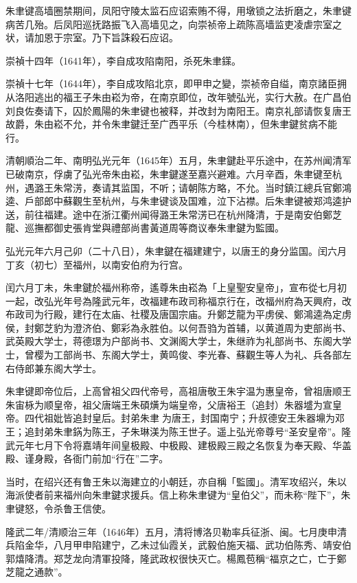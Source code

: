 朱聿键高墙圈禁期间，凤阳守陵太监石应诏索贿不得，用墩锁之法折磨之，朱聿键病苦几殆。后凤阳巡抚路振飞入高墙见之，向崇祯帝上疏陈高墙监吏凌虐宗室之状，请加恩于宗室。乃下旨誅殺石应诏。

崇禎十四年（1641年），李自成攻陷南阳，杀死朱聿鏼。

崇禎十七年（1644年），李自成攻陷北京，即甲申之變，崇祯帝自缢，南京諸臣拥从洛阳逃出的福王子朱由崧为帝，在南京即位，改年號弘光，实行大赦。在广昌伯刘良佐奏请下，囚於鳳陽的朱聿键也被释，并改封为南阳王。南京礼部请恢复唐王故爵，朱由崧不允，并令朱聿鍵迁至广西平乐（今桂林南），但朱聿鍵贫病不能行。

清朝順治二年、南明弘光元年（1645年）五月，朱聿鍵赴平乐途中，在苏州闻清军已破南京，俘虜了弘光帝朱由崧，朱聿鍵遂至嘉兴避难。六月辛酉，朱聿键至杭州，遇潞王朱常淓，奏请其监国，不听；请朝陈方略，不允。当时鎮江總兵官鄭鴻逵、戶部郎中蘇觀生至杭州，与朱聿键谈及国难，泣下沾襟。后朱聿键被郑鸿逵护送，前往福建。途中在浙江衢州闻得潞王朱常淓已在杭州降清，于是南安伯鄭芝龍、巡撫都御史張肯堂與禮部尚書黃道周等商议奉朱聿鍵为監國。

弘光元年六月己卯（二十八日），朱聿鍵在福建建宁，以唐王的身分监国。闰六月丁亥（初七）至福州，以南安伯府为行宫。

闰六月丁未，朱聿鍵於福州称帝，遙尊朱由崧為「上皇聖安皇帝」，宣布從七月初一起，改弘光年号為隆武元年，改福建布政司称福京行在，改福州府為天興府，改布政司为行殿，建行在太庙、社稷及唐国宗庙。升鄭芝龍为平虏侯、鄭鴻逵為定虏侯，封鄭芝豹为澄济伯、鄭彩為永胜伯。以何吾驺为首辅，以黄道周为吏部尚书、武英殿大学士，蒋德璟为户部尚书、文渊阁大学士，朱继祚为礼部尚书、东阁大学士，曾樱为工部尚书、东阁大学士，黄鸣俊、李光春、蘇觀生等人为礼、兵各部左右侍郎兼东阁大学士。

朱聿键即帝位后，上高曾祖父四代帝号，高祖唐敬王朱宇温为惠皇帝，曾祖唐顺王朱宙栐为顺皇帝，祖父唐端王朱碩熿为端皇帝，父唐裕王（追封）朱器墭为宣皇帝。四代祖妣皆追封皇后。封弟朱聿𨮁为唐王，封国南宁；升叔德安王朱器䵺为邓王；追封弟朱聿𨧨为陈王，子朱琳渼为陈王世子。遥上弘光帝尊号“圣安皇帝”。隆武元年七月下令将嘉靖年间皇极殿、中极殿、建极殿三殿之名恢复为奉天殿、华盖殿、谨身殿，各衙门前加“行在”二字。

当时，在绍兴还有鲁王朱以海建立的小朝廷，亦自稱「監國」。清军攻绍兴，朱以海派使者前来福州向朱聿鍵求援兵。信上称朱聿键为“皇伯父”，而未称“陛下”，朱聿键怒，令杀鲁王信使。

隆武二年/清顺治三年（1646年）五月，清将博洛贝勒率兵征浙、闽。七月庚申清兵陷金华，八月甲申陷建宁，乙未过仙霞关，武毅伯施天福、武功伯陈秀、靖安伯郭熺降清。郑芝龙向清軍投降，隆武政权很快灭亡。楊鳳苞稱“福京之亡，亡于鄭芝龍之通款”。

